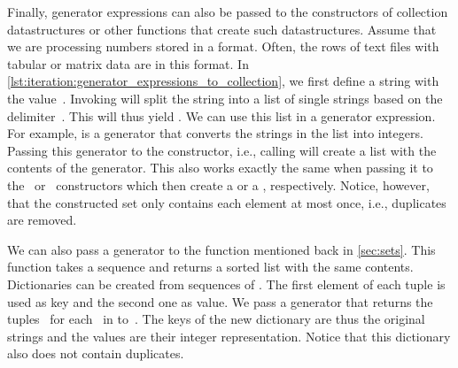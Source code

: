\begin{sloppypar}%
Finally, generator expressions can also be passed to the constructors of collection datastructures or other functions that create such datastructures.
Assume that we are processing numbers stored in a  format.
Often, the rows of text files with tabular or matrix data are in this format.
In \cref{lst:iteration:generator_expressions_to_collection}, we first define a string  with the value~.
Invoking  will split the string into a list of single strings based on the delimiter~.
This will thus yield \pythonil{["22", "56", "33", "67", "43", "33", "12"]}.
We can use this list in a generator expression.
For example,  is a generator that converts the strings in the list into integers.
Passing this generator to the  constructor, i.e., calling  will create a list with the contents of the generator.
This also works exactly the same when passing it to the~ or~ constructors which then create a  or a , respectively.
Notice, however, that the constructed set only contains each element at most once, i.e., duplicates are removed.%
\end{sloppypar}%
%
We can also pass a generator to the  function mentioned back in \cref{sec:sets}.
This function takes a sequence and returns a sorted list with the same contents.
Dictionaries can be created from sequences of .
The first element of each tuple is used as key and the second one as value.
We pass a generator that returns the tuples~ for each~ in  to~.
The keys of the new dictionary are thus the original strings and the values are their integer representation.
Notice that this dictionary also does not contain duplicates.

